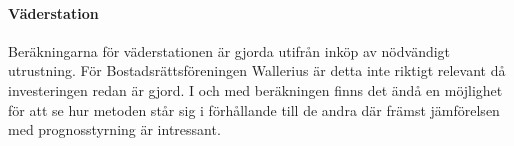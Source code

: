 \paragraph{Väderstation}
Beräkningarna för väderstationen är gjorda utifrån inköp av nödvändigt utrustning. För Bostadsrättsföreningen Wallerius är detta inte riktigt relevant då investeringen redan är gjord. I och med beräkningen finns det ändå en möjlighet för att se hur metoden står sig i förhållande till de andra där främst jämförelsen med prognosstyrning är intressant.
